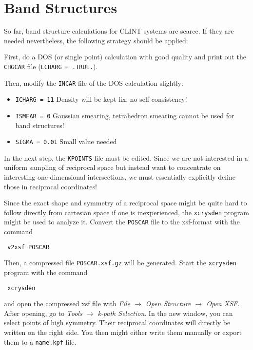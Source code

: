 \documentclass[a4paper,11pt]{article}
\begin{document}
\section{Band Structures}

So far, band structure calculations for CLINT systems are scarce.
If they are needed nevertheless, the following strategy should be applied:

First, do a DOS (or single point) calculation with good quality and print out the 
\texttt{CHGCAR} file (\texttt{LCHARG = .TRUE.}). 

Then, modify the \texttt{INCAR} file of the DOS calculation slightly:

\begin{itemize}
 \item \texttt{ICHARG = 11} Density will be kept fix, no self consistency!
 \item \texttt{ISMEAR = 0} Gaussian smearing, tetrahedron smearing cannot be used for band structures!
 \item \texttt{SIGMA = 0.01} Small value needed
\end{itemize}

In the next step, the \texttt{KPOINTS} file must be edited.
Since we are not interested in a uniform sampling of reciprocal space but instead want 
to concentrate on interesting one-dimensional intersections, we must essentially 
explicitly define those in reciprocal coordinates!

Since the exact shape and symmetry of a reciprocal space might be quite hard to 
follow directly from cartesian space if one is inexperienced, the \texttt{xcrysden}
program might be used to analyze it.
Convert the \texttt{POSCAR} file to the xsf-format with the command

\begin{verbatim}
 v2xsf POSCAR
\end{verbatim}

Then, a compressed file \texttt{POSCAR.xsf.gz} will be generated. 
Start the \texttt{xcrysden} program with the command 

\begin{verbatim}
 xcrysden
\end{verbatim}

and open the compressed xsf file with \textit{File $\rightarrow$ Open Structure $\rightarrow$ Open XSF}.
After opening, go to \textit{Tools $\rightarrow$ k-path Selection}. 
In the new window, you can select points of high symmetry. 
Their reciprocal coordinates will directly be written on the right side.
You then might either write them manually or export them to a \texttt{name.kpf} file.
\end{document}
